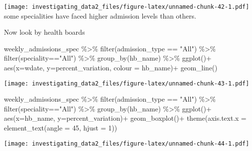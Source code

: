 \documentclass[
]{article}
\newenvironment{Shaded}{\begin{snugshade}}{\end{snugshade}}
\newcommand{\AttributeTok}[1]{\textcolor[rgb]{0.77,0.63,0.00}{#1}}
\newcommand{\DecValTok}[1]{\textcolor[rgb]{0.00,0.00,0.81}{#1}}
\newcommand{\FunctionTok}[1]{\textcolor[rgb]{0.00,0.00,0.00}{#1}}
\newcommand{\NormalTok}[1]{#1}
\newcommand{\SpecialCharTok}[1]{\textcolor[rgb]{0.00,0.00,0.00}{#1}}
\newcommand{\StringTok}[1]{\textcolor[rgb]{0.31,0.60,0.02}{#1}}
\begin{document}
\texttt{[image: investigating\_data2\_files/figure-latex/unnamed-chunk-42-1.pdf]}
some specialities have faced higher admission levels than others.

Now look by health boards

\begin{Shaded}
\begin{Highlighting}[]
\NormalTok{weekly\_admissions\_spec }\SpecialCharTok{\%\textgreater{}\%} 
  \FunctionTok{filter}\NormalTok{(admission\_type }\SpecialCharTok{==} \StringTok{"All"}\NormalTok{) }\SpecialCharTok{\%\textgreater{}\%} 
  \FunctionTok{filter}\NormalTok{(speciality}\SpecialCharTok{==}\StringTok{"All"}\NormalTok{) }\SpecialCharTok{\%\textgreater{}\%} 
  \FunctionTok{group\_by}\NormalTok{(hb\_name) }\SpecialCharTok{\%\textgreater{}\%} 
  \FunctionTok{ggplot}\NormalTok{()}\SpecialCharTok{+}
  \FunctionTok{aes}\NormalTok{(}\AttributeTok{x=}\NormalTok{wdate, }\AttributeTok{y=}\NormalTok{percent\_variation, }\AttributeTok{colour =}\NormalTok{ hb\_name)}\SpecialCharTok{+}
  \FunctionTok{geom\_line}\NormalTok{()}
\end{Highlighting}
\end{Shaded}

\texttt{[image: investigating\_data2\_files/figure-latex/unnamed-chunk-43-1.pdf]}

\begin{Shaded}
\begin{Highlighting}[]
\NormalTok{weekly\_admissions\_spec }\SpecialCharTok{\%\textgreater{}\%} 
  \FunctionTok{filter}\NormalTok{(admission\_type }\SpecialCharTok{==} \StringTok{"All"}\NormalTok{) }\SpecialCharTok{\%\textgreater{}\%} 
  \FunctionTok{filter}\NormalTok{(speciality}\SpecialCharTok{==}\StringTok{"All"}\NormalTok{) }\SpecialCharTok{\%\textgreater{}\%} 
  \FunctionTok{group\_by}\NormalTok{(hb\_name) }\SpecialCharTok{\%\textgreater{}\%} 
  \FunctionTok{ggplot}\NormalTok{()}\SpecialCharTok{+}
  \FunctionTok{aes}\NormalTok{(}\AttributeTok{x=}\NormalTok{hb\_name, }\AttributeTok{y=}\NormalTok{percent\_variation)}\SpecialCharTok{+}
  \FunctionTok{geom\_boxplot}\NormalTok{()}\SpecialCharTok{+}
  \FunctionTok{theme}\NormalTok{(}\AttributeTok{axis.text.x =} \FunctionTok{element\_text}\NormalTok{(}\AttributeTok{angle =} \DecValTok{45}\NormalTok{, }\AttributeTok{hjust =} \DecValTok{1}\NormalTok{))}
\end{Highlighting}
\end{Shaded}

\texttt{[image: investigating\_data2\_files/figure-latex/unnamed-chunk-44-1.pdf]}
\end{document}

